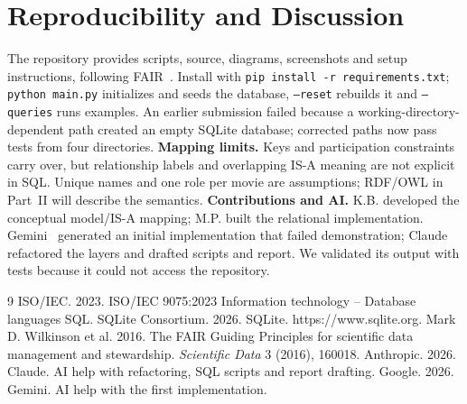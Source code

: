 \documentclass[sigconf,nonacm]{acmart}
\newcommand{\tn}[1]{\texttt{#1}}
\begin{document}
\section{Reproducibility and Discussion}
The repository provides scripts, source, diagrams, screenshots and setup instructions, following FAIR~\cite{fair}. Install with \tn{pip install -r requirements.txt}; \tn{python main.py} initializes and seeds the database, \tn{--reset} rebuilds it and \tn{--queries} runs examples. An earlier submission failed because a working-directory-dependent path created an empty SQLite database; corrected paths now pass tests from four directories.
\textbf{Mapping limits.} Keys and participation constraints carry over, but relationship labels and overlapping IS-A meaning are not explicit in SQL. Unique names and one role per movie are assumptions; RDF/OWL in Part~II will describe the semantics.
\textbf{Contributions and AI.} K.B. developed the conceptual model/IS-A mapping; M.P. built the relational implementation. Gemini~\cite{gemini} generated an initial implementation that failed demonstration; Claude~\cite{claude} refactored the layers and drafted scripts and report. We validated its output with tests because it could not access the repository.



\begin{thebibliography}{9}
 ISO/IEC. 2023. ISO/IEC 9075:2023 Information technology -- Database languages SQL.
 SQLite Consortium. 2026. SQLite. https://www.sqlite.org.
 Mark D. Wilkinson et al. 2016. The FAIR Guiding Principles for scientific data management and stewardship. \emph{Scientific Data} 3 (2016), 160018.
 Anthropic. 2026. Claude. AI help with refactoring, SQL scripts and report drafting.
 Google. 2026. Gemini. AI help with the first implementation.
\end{thebibliography}
\end{document}

